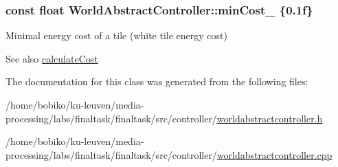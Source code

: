 \subsubsection[{\texorpdfstring{min\+Cost\+\_\+}{minCost_}}]{\setlength{\rightskip}{0pt plus 5cm}const float World\+Abstract\+Controller\+::min\+Cost\+\_\+ \{0.\+1f\}\hspace{0.3cm}{\ttfamily [protected]}}\hypertarget{classWorldAbstractController_a4064e89beaf84bbaf8c018058c821c8a}{}\label{classWorldAbstractController_a4064e89beaf84bbaf8c018058c821c8a}


Minimal energy cost of a tile (white tile energy cost) 

\begin{DoxySeeAlso}{See also}
\hyperlink{classWorldAbstractController_a556c8e2b55b017f5e837db2b58d3553e}{calculate\+Cost} 
\end{DoxySeeAlso}


The documentation for this class was generated from the following files\+:\begin{DoxyCompactItemize}
\item 
/home/bobiko/ku-\/leuven/media-\/processing/labs/finaltask/finaltask/src/controller/\hyperlink{worldabstractcontroller_8h}{worldabstractcontroller.\+h}\item 
/home/bobiko/ku-\/leuven/media-\/processing/labs/finaltask/finaltask/src/controller/\hyperlink{worldabstractcontroller_8cpp}{worldabstractcontroller.\+cpp}\end{DoxyCompactItemize}
